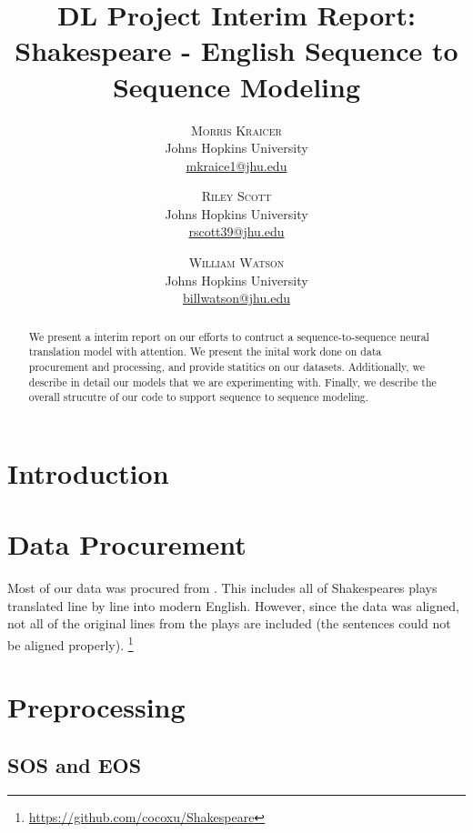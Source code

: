 \documentclass[twoside,twocolumn]{article}
\title{DL Project Interim Report:\\
       Shakespeare - English Sequence to Sequence Modeling}
\author{%
\textsc{Morris Kraicer} \\[1ex]
\normalsize Johns Hopkins University \\
\normalsize \href{mailto:mkraice1@jhu.edu}{mkraice1@jhu.edu}
 \and
 \textsc{Riley Scott} \\[1ex]
\normalsize Johns Hopkins University \\
\normalsize \href{mailto:rscott39@jhu.edu}{rscott39@jhu.edu}
 \and
  \textsc{William Watson} \\[1ex]
\normalsize Johns Hopkins University \\
\normalsize \href{mailto:billwatson@jhu.edu}{billwatson@jhu.edu}
}
\date{}%
\begin{document}
\maketitle



\begin{abstract}
\noindent
We present a interim report on our efforts to contruct a sequence-to-sequence
neural translation model with attention. We present the inital work done on
data procurement and processing, and provide statitics on our datasets.
Additionally, we describe in detail our models that we are experimenting with.
Finally, we describe the overall strucutre of our code to support sequence
to sequence modeling.
\end{abstract}


\section{Introduction}



\section{Data Procurement}
Most of our data was procured from \cite{xu2012paraphrasing}.
This includes all of Shakespeares plays translated line by line into modern
English. However, since the data was aligned, not all of the original lines
from the plays are included (the sentences could not be aligned properly).
\footnote{\url{https://github.com/cocoxu/Shakespeare}}



\section{Preprocessing}
\subsection{SOS and EOS}
\end{document}

